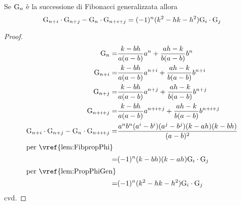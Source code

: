 \begin{thm}\label{thm:fibVajdaGen}
	Se $\mathrm{G}_{n}$ è la successione di Fibonacci generalizzata allora 
	\begin{equation}
		\mathrm{G}_{n+i}\cdot\mathrm{G}_{n+j}-\mathrm{G}_{n}\cdot\mathrm{G}_{n+i+j}=(-1)^{n}(k^2-hk-h^2)\mathrm{G}_{i}\cdot\mathrm{G}_{j}
	\end{equation}\label{eqn:fibVajdaGen}
\end{thm}
\begin{proof}
	\begin{align*}
		\Gib{n}=&{}\dfrac{k-bh}{a(a-b)}a^n+\dfrac{ah-k}{b(a-b)}b^n\\
		\Gib{n+i}=&{}\dfrac{k-bh}{a(a-b)}a^{n+i}+\dfrac{ah-k}{b(a-b)}b^{n+i}\\
		\Gib{n+j}=&{}\dfrac{k-bh}{a(a-b)}a^{n+j}+\dfrac{ah-k}{b(a-b)}b^{n+j}\\
		\Gib{n+i+j}=&{}\dfrac{k-bh}{a(a-b)}a^{n+i+j}+\dfrac{ah-k}{b(a-b)}b^{n+i+j}\\
		\Gib{n+i}\cdot\Gib{n+j}-\Gib{n}\cdot\Gib{n+i+j}=&\dfrac{a^nb^n(a^i-b^i)(a^j-b^j)(k-ah)(k-bh)}{(a-b)^2}\\
		\intertext{per~\vref{lem:FibpropPhi}}
		=&(-1)^{n}(k-bh)(k-ah)\Gib{i}\cdot\Gib{j}\\
		\intertext{per~\vref{lem:PropPhiGen}}
		=&(-1)^{n}(k^2-hk-h^2)\Gib{i}\cdot\Gib{j}\\
	\end{align*}
	cvd.
\end{proof}
